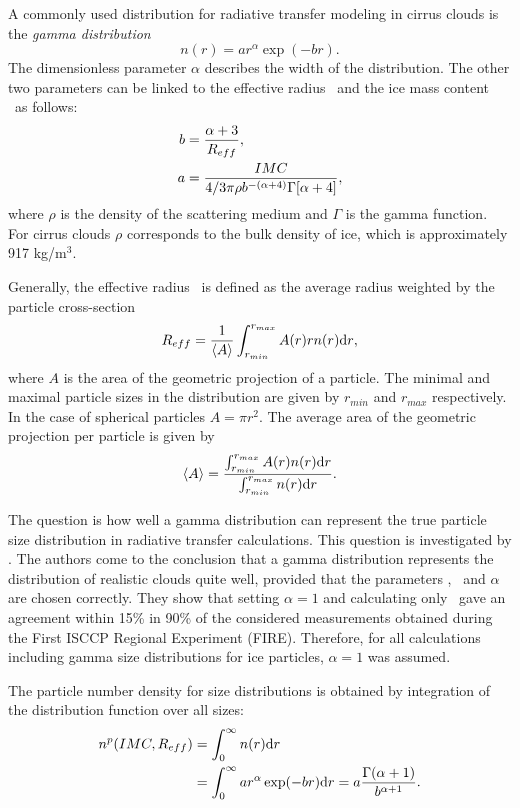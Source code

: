 A commonly used distribution for radiative transfer modeling in cirrus
clouds is the \emph{gamma distribution}
\begin{equation}
  n(r) = a  r^\alpha \exp(-br).
\label{eq:gamma_distr}
\end{equation}
The dimensionless parameter $\alpha$ describes the width of the
distribution. The other two parameters can be linked to the effective
radius \Reff\ and the ice mass content \imc\ as follows:
\begin{eqnarray}
  b &= \frac{\alpha+3}{R_{eff}},\\
  a &= \frac{IMC}{4/3\pi\rho b^{-(\alpha+4)}\Gamma[\alpha+4]},
\label{eq:gamma_coeff}
\end{eqnarray}
where $\rho$ is the density of the scattering medium and $\Gamma$ is
the gamma function. For cirrus clouds $\rho$ corresponds to the bulk
density of ice, which is approximately 917 kg/m$^3$.

Generally, the effective radius \Reff\ is defined as the average
radius weighted by the particle cross-section
\begin{equation}
  \label{eq:Reff}
  R_{eff}= \frac{1}{\left\langle A \right\rangle} \int_{r_{min}}^{r_{max}} {A(r) r n(r) \mathrm{d} r},
\end{equation}
where $A$ is the area of the geometric projection of a particle. The
minimal and maximal particle sizes in the distribution are given by
$r_{min}$ and $r_{max}$ respectively. In the case of spherical
particles $A = \pi r^2$. The average area of the geometric projection
per particle  is given by
\begin{equation}
  \left\langle A \right\rangle = \frac{\int_{r_{min}}^{r_{max}} {A(r) n(r) \mathrm{d} r}}{\int_{r_{min}}^{r_{max}} {n(r) \mathrm{d} r}}.
\end{equation}

The question is how well a gamma distribution can represent the true
particle size distribution in radiative transfer calculations. This
question is investigated by \citet{evans:98}. The authors come to the
conclusion that a gamma distribution represents the distribution of
realistic clouds quite well, provided that the parameters \Reff, \imc\ 
and $\alpha$ are chosen correctly. They show that setting $\alpha = 1$
and calculating only \Reff\ gave an agreement within 15\% in 90\% of
the considered measurements obtained during the First ISCCP Regional
Experiment (FIRE).  Therefore, for all calculations including gamma
size distributions for ice particles, $\alpha = 1$ was assumed.  

The particle number density for size distributions is obtained by
integration of the distribution function over all sizes:
\begin{eqnarray}
  n^p(IMC, R_{eff}) &= \int_0^\infty {n(r)\ensuremath{\mathrm{d}}r} \\
 &= \int_0^\infty {a  r^\alpha \exp(-br)
    \ensuremath{\mathrm{d}}r} = a \frac{\Gamma(\alpha+1)}{b^{\alpha+1}}.
\end{eqnarray}

